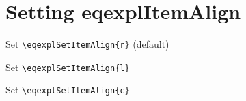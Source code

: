 \documentclass{article}
\begin{document}
\section{Setting eqexplItemAlign}

Set \verb+\eqexplSetItemAlign{r}+ (default)
\begin{eqexpl}
  \testList
\end{eqexpl}

Set \verb+\eqexplSetItemAlign{l}+
\begin{eqexpl}
  \testList
\end{eqexpl}

Set \verb+\eqexplSetItemAlign{c}+
\begin{eqexpl}
  \testList
\end{eqexpl}

\end{document}
